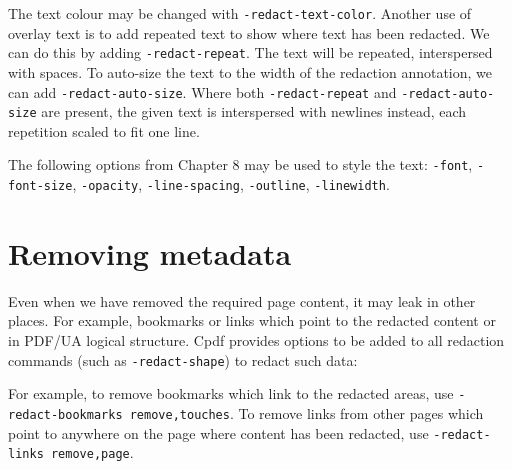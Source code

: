 \documentclass{book}
\begin{document}
\noindent The text colour may be changed with \texttt{-redact-text-color}. Another use of overlay text is to add repeated text to show where text has been redacted. We can do this by adding \texttt{-redact-repeat}. The text will be repeated, interspersed with spaces. To auto-size the text to the width of the redaction annotation, we can add \texttt{-redact-auto-size}. Where both \texttt{-redact-repeat} and \texttt{-redact-auto-size} are present, the given text is interspersed with newlines instead, each repetition scaled to fit one line.

The following options from Chapter 8 may be used to style the text: \texttt{-font}, \texttt{-font-size}, \texttt{-opacity}, \texttt{-line-spacing}, \texttt{-outline}, \texttt{-linewidth}.

\section{Removing metadata}

Even when we have removed the required page content, it may leak in other places. For example, bookmarks or links which point to the redacted content or in PDF/UA logical structure. Cpdf provides options to be added to all redaction commands (such as \texttt{-redact-shape}) to redact such data:

\medskip


\noindent For example, to remove bookmarks which link to the redacted areas, use \texttt{-redact-bookmarks remove,touches}. To remove links from other pages which point to anywhere on the page where content has been redacted, use \texttt{-redact-links remove,page}.
\end{document}
